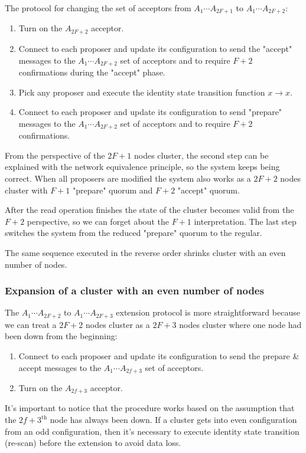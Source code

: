 \documentclass[12pt]{article}
\theoremstyle{definition}
\begin{document}
The protocol for changing the set of acceptors from $A_1 \cdots A_{2F+1}$ to $A_1 \cdots A_{2F+2}$:
\begin{enumerate}
  \item Turn on the $A_{2F+2}$ acceptor.
  \item Connect to each proposer and update its configuration to send the "accept" messages to the $A_1 \cdots A_{2F+2}$ set of acceptors and to require $F+2$ confirmations during the "accept" phase.\label{dual}
  \item Pick any proposer and execute the identity state transition function $x \to x$.\label{rescan}
  \item Connect to each proposer and update its configuration to send "prepare" messages to the $A_1 \cdots A_{2F+2}$ set of acceptors and to require $F+2$ confirmations.
\end{enumerate}

From the perspective of the $2F+1$ nodes cluster, the second step can be explained with the network equivalence principle, so the system keeps being correct. When all proposers are modified the system also works as a $2F+2$ nodes cluster with $F+1$ "prepare" quorum and $F+2$ "accept" quorum.

After the read operation finishes the state of the cluster becomes valid from the $F+2$ perspective, so we can forget about the $F+1$ interpretation. The last step switches the system from the reduced "prepare" quorum to the regular.

The same sequence executed in the reverse order shrinks cluster with an even number of nodes.

\subsubsection{Expansion of a cluster with an even number of nodes}

The $A_1 \cdots A_{2F+2}$ to $A_1 \cdots A_{2F+3}$ extension protocol is more straightforward because we can treat a $2F+2$ nodes cluster as a $2F+3$ nodes cluster where one node had been down from the beginning:
\begin{enumerate}
  \item Connect to each proposer and update its configuration to send the prepare \& accept messages to the $A_1 \cdots A_{2f+3}$ set of acceptors.
  \item Turn on the $A_{2f+3}$ acceptor.
\end{enumerate}

It's important to notice that the procedure works based on the assumption that the $2f+3^{\mbox{th}}$ node has always been down. If a cluster gets into even configuration from an odd configuration, then it's necessary to execute identity state transition (re-scan) before the extension to avoid data loss. 
\end{document}
